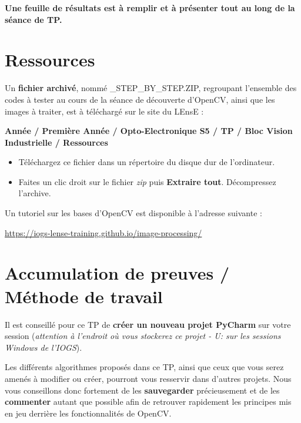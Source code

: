 \bigskip

\textbf{Une feuille de résultats est à remplir et à présenter tout au long de la séance de TP.}

\section{Ressources}

Un \textbf{fichier archivé}, nommé \_STEP\_BY\_STEP.ZIP, regroupant l'ensemble des codes à tester au cours de la séance de découverte d'OpenCV, ainsi que les images à traiter, est à téléchargé sur le site du LEnsE : 

\textbf{Année / Première Année / Opto-Electronique S5 / TP / Bloc Vision Industrielle / Ressources}

\vspace{0.5cm}

\begin{itemize}
	\item Téléchargez ce fichier dans un répertoire du disque dur  de l'ordinateur.
	\item Faites un clic droit sur le fichier \textit{zip} puis \textbf{Extraire tout}. Décompressez l'archive.
\end{itemize}

\medskip

Un tutoriel sur les bases d'OpenCV est disponible à l’adresse suivante : 

\href{https://iogs-lense-training.github.io/image-processing/}{https://iogs-lense-training.github.io/image-processing/}


\section{Accumulation de preuves / Méthode de travail}

Il est conseillé pour ce TP de \textbf{créer un nouveau projet PyCharm} sur votre session (\textit{attention à l'endroit où vous stockerez ce projet - U: sur les sessions Windows de l'IOGS}).

Les différents algorithmes proposés dans ce TP, ainsi que ceux que vous serez amenés à modifier ou créer, pourront vous resservir dans d'autres projets. Nous vous conseillons donc fortement de les \textbf{sauvegarder} précieusement et de les \textbf{commenter} autant que possible afin de retrouver rapidement les principes mis en jeu derrière les fonctionnalités de OpenCV.

\medskip

